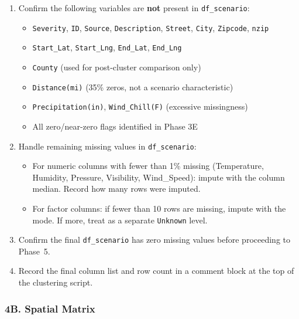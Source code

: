 \documentclass[11pt]{article}
\begin{document}
\begin{enumerate}
  \item Confirm the following variables are \textbf{not} present in \texttt{df\_scenario}:
  \begin{itemize}
    \item \texttt{Severity}, \texttt{ID}, \texttt{Source}, \texttt{Description}, \texttt{Street}, \texttt{City}, \texttt{Zipcode}, \texttt{nzip}
    \item \texttt{Start\_Lat}, \texttt{Start\_Lng}, \texttt{End\_Lat}, \texttt{End\_Lng}
    \item \texttt{County} (used for post-cluster comparison only)
    \item \texttt{Distance(mi)} (35\% zeros, not a scenario characteristic)
    \item \texttt{Precipitation(in)}, \texttt{Wind\_Chill(F)} (excessive missingness)
    \item All zero/near-zero flags identified in Phase 3E
  \end{itemize}

  \item Handle remaining missing values in \texttt{df\_scenario}:
  \begin{itemize}
    \item For numeric columns with fewer than 1\% missing (Temperature, Humidity, Pressure, Visibility, Wind\_Speed): impute with the column median. Record how many rows were imputed.
    \item For factor columns: if fewer than 10 rows are missing, impute with the mode. If more, treat as a separate \texttt{Unknown} level.
  \end{itemize}

  \item Confirm the final \texttt{df\_scenario} has zero missing values before proceeding to Phase~5.

  \item Record the final column list and row count in a comment block at the top of the clustering script.
\end{enumerate}

\subsubsection*{4B. Spatial Matrix}
\end{document}

